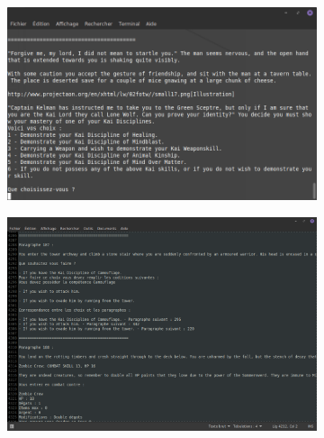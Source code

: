 		\begin{figure}[H]
			\centering
			\begin{subfigure}[c]{0.38\textwidth}
				\includegraphics[width=\textwidth, keepaspectratio]{img/jeu_choix.png}
			\end{subfigure}
			\hspace{1cm}
			\begin{subfigure}[c]{0.38\textwidth}
				\includegraphics[width=\textwidth, keepaspectratio]{img/export_txt.png}
			\end{subfigure}
		\end{figure}
